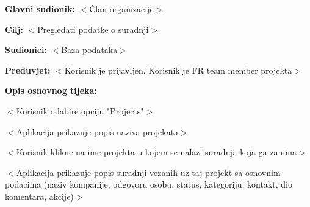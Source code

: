 					\noindent {}
					\begin{packed_item}
					
						\item \textbf{Glavni sudionik:} $<$Član organizacije$>$
						\item \textbf{Cilj:} $<$Pregledati podatke o suradnji$>$
						\item \textbf{Sudionici:} $<$Baza podataka$>$
						\item \textbf{Preduvjet:} $<$Korisnik je prijavljen, Korisnik je FR team member projekta$>$
						\item \textbf{Opis osnovnog tijeka:}

						\item[] \begin{packed_enum}

							\item $<$Korisnik odabire opciju "Projects"$>$
							\item $<$Aplikacija prikazuje popis naziva projekata$>$
							\item $<$Korisnik klikne na ime projekta u kojem se nalazi suradnja koja ga zanima$>$
							\item $<$Aplikacija prikazuje popis suradnji vezanih uz taj projekt sa osnovnim podacima (naziv kompanije, odgovoru osobu, status, kategoriju, kontakt, dio komentara, akcije)$>$
						\end{packed_enum}
	
					\end{packed_item}

